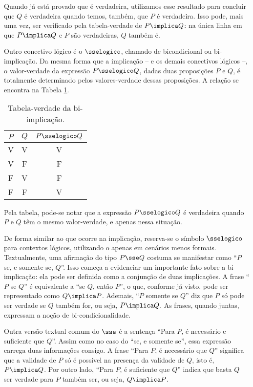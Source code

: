 Quando já está provado que  é verdadeira, utilizamos esse resultado para concluir que $Q$ é verdadeira quando temos, também, que $P$ é verdadeira. Isso pode, mais uma vez, ser verificado pela tabela-verdade de $P \implica Q$: na única linha em que $P \implica Q$ e $P$ são verdadeiras, $Q$ também é.

Outro conectivo lógico é o $\sselogico$, chamado de bicondicional ou bi-implicação.
Da mesma forma que a implicação -- e os demais conectivos lógicos --, o valor-verdade da expressão $P \sselogico Q$, dadas duas proposições $P$ e $Q$, é totalmente determinado pelos valores-verdade dessas proposições.
A relação se encontra na Tabela \ref{tbl:bi-implicacao}.

\begin{table}[h]
	\centering
	\begin{tabular}{cc|c}
		$P$		& $Q$		& $P \sselogico Q$	\\ \hline
		V		& V			& V			\\
		V		& F			& F			\\
		F		& V			& F			\\
		F		& F			& V			\\	
	\end{tabular}
	\caption{Tabela-verdade da bi-implicação.}
	\label{tbl:bi-implicacao}
\end{table}

Pela tabela, pode-se notar que a expressão $P \sselogico Q$ é verdadeira quando $P$ e $Q$ têm o mesmo valor-verdade, e apenas nessa situação.

De forma similar ao que ocorre na implicação, reserva-se o símbolo $\sselogico$ para contextos lógicos, utilizando o \entreaspas{$\sse$} apenas em cenários menos formais. Textualmente, uma afirmação do tipo $P \sse Q$ costuma se manifestar como ``$P$ se, e somente se, $Q$''. Isso começa a evidenciar um importante fato sobre a bi-implicação: ela pode ser definida como a conjunção de duas implicações. A frase ``$P$ se $Q$'' é equivalente a ``se $Q$, então $P$'', o que, conforme já visto, pode ser representado como $Q \implica P$. Ademais, ``$P$ somente se $Q$'' diz que $P$ só pode ser verdade se $Q$ também for, ou seja, $P \implica Q$. As frases, quando juntas, expressam a noção de bi-condicionalidade.

Outra versão textual comum do $\sse$ é a sentença ``Para $P$, é necessário e suficiente que $Q$''. Assim como no caso do ``se, e somente se'', essa expressão carrega duas informações consigo. A frase ``Para $P$, é necessário que $Q$'' significa que a validade de $P$ só é possível na presença da validade de $Q$, isto é, $P \implica Q$. Por outro lado, ``Para $P$, é suficiente que $Q$'' indica que basta $Q$ ser verdade para $P$ também ser, ou seja, $Q \implica P$.

